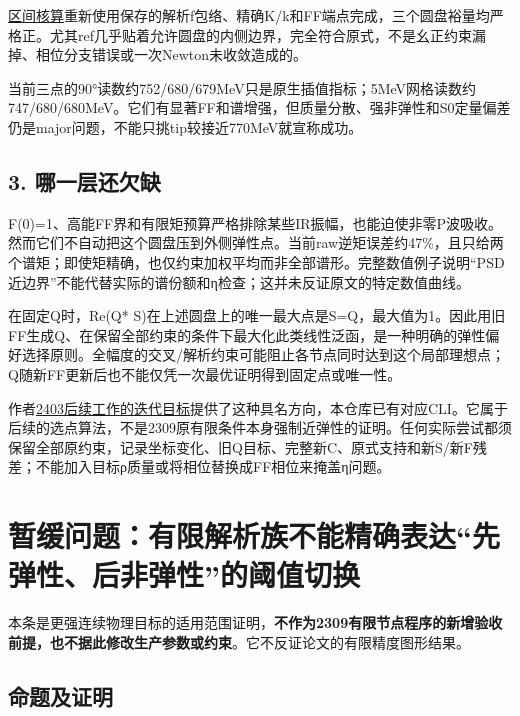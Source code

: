 \documentclass[
  10pt,
  a4paper,
]{article}
\begin{document}
\href{../GRAM_DISK_DIAGNOSTIC.json}{区间核算}重新使用保存的解析f包络、精确K/k和FF端点完成，三个圆盘裕量均严格正。尤其ref几乎贴着允许圆盘的内侧边界，完全符合原式，不是幺正约束漏掉、相位分支错误或一次Newton未收敛造成的。

当前三点的90°读数约752/680/679MeV只是原生插值指标；5MeV网格读数约747/680/680MeV。它们有显著FF和谱增强，但质量分散、强非弹性和S0定量偏差仍是major问题，不能只挑tip较接近770MeV就宣称成功。

\subsection{3. 哪一层还欠缺}\label{ux54eaux4e00ux5c42ux8fd8ux6b20ux7f3a}

F(0)=1、高能FF界和有限矩预算严格排除某些IR振幅，也能迫使非零P波吸收。然而它们不自动把这个圆盘压到外侧弹性点。当前raw逆矩误差约47\%，且只给两个谱矩；即使矩精确，也仅约束加权平均而非全部谱形。完整数值例子说明``PSD近边界''不能代替实际的谱份额和η检查；这并未反证原文的特定数值曲线。

在固定Q时，Re(Q*
S)在上述圆盘上的唯一最大点是S=Q，最大值为1。因此用旧FF生成Q、在保留全部约束的条件下最大化此类线性泛函，是一种明确的弹性偏好选择原则。全幅度的交叉/解析约束可能阻止各节点同时达到这个局部理想点；Q随新FF更新后也不能仅凭一次最优证明得到固定点或唯一性。

作者\href{https://arxiv.org/html/2403.10772v4}{2403后续工作的迭代目标}提供了这种具名方向，本仓库已有对应CLI。它属于后续的选点算法，不是2309原有限条件本身强制近弹性的证明。任何实际尝试都须保留全部原约束，记录坐标变化、旧Q目标、完整新C、原式支持和新S/新F残差；不能加入目标ρ质量或将相位替换成FF相位来掩盖η问题。

\newpage

\section{暂缓问题：有限解析族不能精确表达``先弹性、后非弹性''的阈值切换}\label{ux6682ux7f13ux95eeux9898ux6709ux9650ux89e3ux6790ux65cfux4e0dux80fdux7cbeux786eux8868ux8fbeux5148ux5f39ux6027ux540eux975eux5f39ux6027ux7684ux9608ux503cux5207ux6362}

本条是更强连续物理目标的适用范围证明，\textbf{不作为2309有限节点程序的新增验收前提，也不据此修改生产参数或约束}。它不反证论文的有限精度图形结果。

\subsection{命题及证明}\label{ux547dux9898ux53caux8bc1ux660e}
\end{document}
